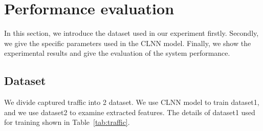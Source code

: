 \documentclass[conference]{IEEEtran}
\begin{document}



\section{Performance evaluation}
\label{sec:performanceevaluation}
In this section, we introduce the dataset used in our experiment firstly. Secondly, we give the specific parameters used in the CLNN model. Finally, we show the experimental results and give the evaluation of the system performance.
\subsection{Dataset}
\label{sec:dataset}
We divide captured traffic into 2 dataset. We use CLNN model to train dataset1, and we use dataset2 to examine extracted features. The details of dataset1 used for training shown in Table~\ref{tab:traffic}.
\end{document}
